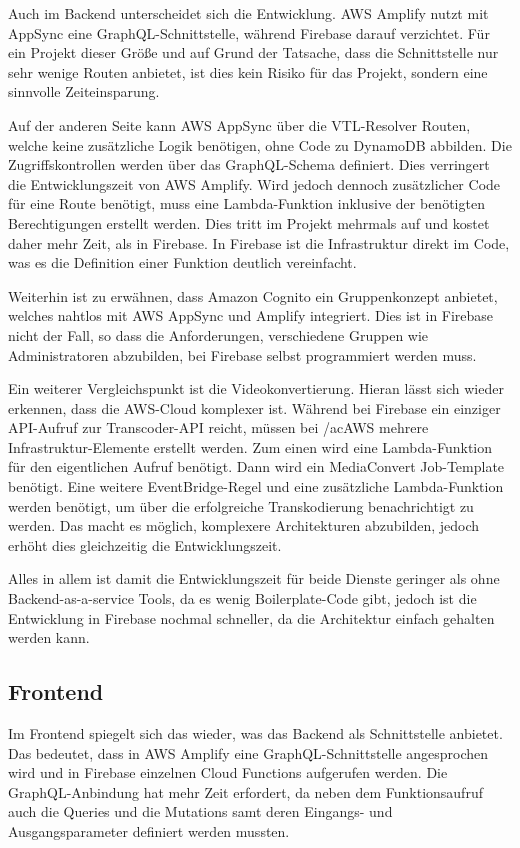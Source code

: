 Auch im Backend unterscheidet sich die Entwicklung. \ac{AWS} Amplify nutzt mit AppSync eine GraphQL-Schnittstelle, während Firebase darauf verzichtet. Für ein Projekt dieser Größe und auf Grund der Tatsache, dass die Schnittstelle nur sehr wenige Routen anbietet, ist dies kein Risiko für das Projekt, sondern eine sinnvolle Zeiteinsparung.

Auf der anderen Seite kann \ac{AWS} AppSync über die VTL-Resolver Routen, welche keine zusätzliche Logik benötigen, ohne Code zu DynamoDB abbilden. Die Zugriffskontrollen werden über das GraphQL-Schema definiert. Dies verringert die Entwicklungszeit von \ac{AWS} Amplify. Wird jedoch dennoch zusätzlicher Code für eine Route benötigt, muss eine Lambda-Funktion inklusive der benötigten Berechtigungen erstellt werden. Dies tritt im Projekt mehrmals auf und kostet daher mehr Zeit, als in Firebase. In Firebase ist die Infrastruktur direkt im Code, was es die Definition einer Funktion deutlich vereinfacht.

Weiterhin ist zu erwähnen, dass Amazon Cognito ein Gruppenkonzept anbietet, welches nahtlos mit \ac{AWS} AppSync und Amplify integriert. Dies ist in Firebase nicht der Fall, so dass die Anforderungen, verschiedene Gruppen wie Administratoren abzubilden, bei Firebase selbst programmiert werden muss.

Ein weiterer Vergleichspunkt ist die Videokonvertierung. Hieran lässt sich wieder erkennen, dass die \ac{AWS}-Cloud komplexer ist. Während bei Firebase ein einziger API-Aufruf zur Transcoder-API reicht, müssen bei /ac{AWS} mehrere Infrastruktur-Elemente erstellt werden. Zum einen wird eine Lambda-Funktion für den eigentlichen Aufruf benötigt. Dann wird ein MediaConvert Job-Template benötigt. Eine weitere EventBridge-Regel und eine zusätzliche Lambda-Funktion werden benötigt, um über die erfolgreiche Transkodierung benachrichtigt zu werden. Das macht es möglich, komplexere Architekturen abzubilden, jedoch erhöht dies gleichzeitig die Entwicklungszeit.

Alles in allem ist damit die Entwicklungszeit für beide Dienste geringer als ohne Backend-as-a-service Tools, da es wenig Boilerplate-Code gibt, jedoch ist die Entwicklung in Firebase nochmal schneller, da die Architektur einfach gehalten werden kann.

\subsection{Frontend}

Im Frontend spiegelt sich das wieder, was das Backend als Schnittstelle anbietet. Das bedeutet, dass in \ac{AWS} Amplify eine GraphQL-Schnittstelle angesprochen wird und in Firebase einzelnen Cloud Functions aufgerufen werden. Die GraphQL-Anbindung hat mehr Zeit erfordert, da neben dem Funktionsaufruf auch die Queries und die Mutations samt deren Eingangs- und Ausgangsparameter definiert werden mussten.

